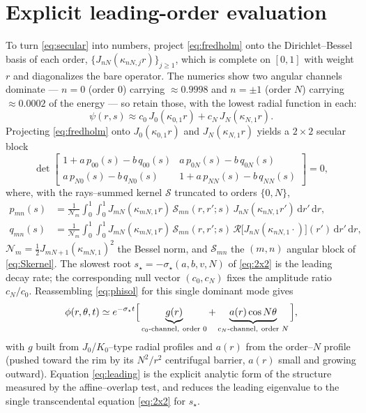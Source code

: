 \documentclass{article}
\newcommand{\rd}{\mathrm{d}}
\begin{document}
\section{Explicit leading-order evaluation}

To turn \eqref{eq:secular} into numbers, project \eqref{eq:fredholm} onto the
Dirichlet--Bessel basis of each order, $\{J_{nN}(\kappa_{nN,j}r)\}_{j\ge1}$, which
is complete on $[0,1]$ with weight $r$ and diagonalizes the bare operator. The
numerics show two angular channels dominate --- $n=0$ (order $0$) carrying
$\approx 0.9998$ and $n=\pm1$ (order $N$) carrying $\approx 0.0002$ of the energy
--- so retain those, with the lowest radial function in each:
\begin{equation}
\psi(r,s)\approx c_0\,J_0(\kappa_{0,1}r)+c_N\,J_N(\kappa_{N,1}r).
\end{equation}
Projecting \eqref{eq:fredholm} onto $J_0(\kappa_{0,1}r)$ and
$J_N(\kappa_{N,1}r)$ yields a $2\times2$ secular block
\begin{equation}
\det
\begin{bmatrix}
1+a\,p_{00}(s)-b\,q_{00}(s) & a\,p_{0N}(s)-b\,q_{0N}(s)\\[4pt]
a\,p_{N0}(s)-b\,q_{N0}(s) & 1+a\,p_{NN}(s)-b\,q_{NN}(s)
\end{bmatrix}=0,
\label{eq:2x2}
\end{equation}
where, with the rays--summed kernel $\mathcal S$ truncated to orders $\{0,N\}$,
\begin{align}
p_{mn}(s)&=\frac{1}{\mathcal N_m}\!\int_0^1\!\!\int_0^1
J_{mN}(\kappa_{mN,1}r)\,\mathcal S_{mn}(r,r';s)\,J_{nN}(\kappa_{nN,1}r')\,\rd r'\,\rd r,
\\
q_{mn}(s)&=\frac{1}{\mathcal N_m}\!\int_0^1\!\!\int_0^1
J_{mN}(\kappa_{mN,1}r)\,\mathcal S_{mn}(r,r';s)\,
\mathcal R\!\bigl[J_{nN}(\kappa_{nN,1}\cdot)\bigr]\!(r')\,\rd r'\,\rd r,
\end{align}
$\mathcal N_m=\tfrac12 J_{mN+1}(\kappa_{mN,1})^2$ the Bessel norm, and
$\mathcal S_{mn}$ the $(m,n)$ angular block of \eqref{eq:Skernel}. The slowest
root $s_\star=-\sigma_\star(a,b,v,N)$ of \eqref{eq:2x2} is the leading decay
rate; the corresponding null vector $(c_0,c_N)$ fixes the amplitude ratio
$c_N/c_0$. Reassembling \eqref{eq:phisol} for this single dominant mode gives
\begin{equation}
\phi(r,\theta,t)\simeq e^{-\sigma_\star t}
\Bigl[\,\underbrace{g(r)}_{c_0\text{-channel},\ \text{order }0}
+\underbrace{a(r)\cos N\theta}_{c_N\text{-channel},\ \text{order }N}\,\Bigr],
\label{eq:leading}
\end{equation}
with $g$ built from $J_0$/$K_0$--type radial profiles and $a(r)$ from the
order--$N$ profile (pushed toward the rim by its $N^2/r^2$ centrifugal barrier,
$a(r)$ small and growing outward). Equation \eqref{eq:leading} is the explicit
analytic form of the structure measured by the affine--overlap test, and reduces
the leading eigenvalue to the single transcendental equation \eqref{eq:2x2} for
$s_\star$.
\end{document}
